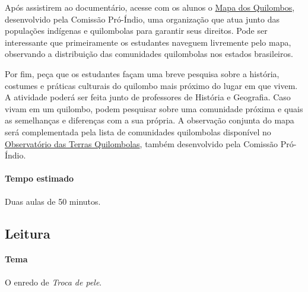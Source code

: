 \documentclass[11pt]{extarticle}
\begin{document}

Após assistirem ao documentário, acesse com os alunos o \href{https://cpisp.org.br/mapa-dos-quilombos-geografia-da-resistencia/}{Mapa dos Quilombos}, desenvolvido pela Comissão Pró-Índio, uma organização que atua junto das populações indígenas e quilombolas para garantir seus direitos. Pode ser interessante que primeiramente os estudantes naveguem livremente pelo mapa, observando a distribuição das comunidades quilombolas nos estados brasileiros.


Por fim, peça que os estudantes façam uma breve pesquisa sobre a história, costumes e práticas culturais do quilombo mais próximo do lugar em que vivem. A atividade poderá ser feita junto de professores de História e Geografia. Caso vivam em um quilombo, podem pesquisar sobre uma comunidade próxima e quais as semelhanças e diferenças com a sua própria. A observação conjunta do mapa será complementada pela lista de comunidades quilombolas disponível no \href{https://cpisp.org.br/direitosquilombolas/observatorio-terras-quilombolas/}{Observatório das Terras Quilombolas}, também desenvolvido pela Comissão Pró-Índio. 

\paragraph{Tempo estimado} Duas aulas de 50 minutos.

\subsection{Leitura}


\paragraph{Tema} O enredo de \textit{Troca de pele}.
\end{document}
